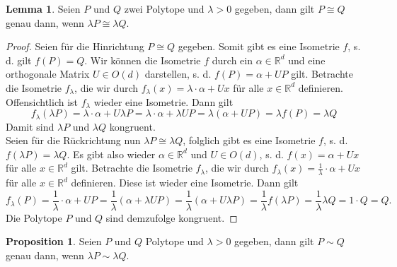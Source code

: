 \documentclass[11pt,titlepage]{article}
\newcommand{\setR}{\mathbb{R}}
\theoremstyle{definition}
\newtheorem{proposition}[theorem]{Proposition}
\newtheorem{lemma}[theorem]{Lemma}
\theoremstyle{remark}
\begin{document}
	\begin{lemma} \label{lemma:dilkong}
		Seien $P$ und $Q$ zwei Polytope und $\lambda>0$ gegeben, dann gilt 
		$P\cong Q$ genau dann, wenn $\lambda P\cong \lambda Q$.
	\end{lemma}
	
	\begin{proof}
		Seien für die Hinrichtung $P\cong Q$ gegeben. Somit gibt es eine Isometrie 
		$f$, s. d. gilt $f(P)=Q$. Wir können die Isometrie $f$ durch ein $\alpha\in
		\setR^d$ und eine orthogonale Matrix $U\in O(d)$ darstellen, s. d. 
		$f(P)=\alpha + UP$ gilt. Betrachte die Isometrie $f_{\lambda}$, die wir 
		durch $f_{\lambda}(x)=\lambda\cdot \alpha +Ux$ für alle $x\in\setR^d$ definieren. 
		Offensichtlich ist $f_{\lambda}$ wieder eine Isometrie. 
		Dann gilt
		\[f_{\lambda}(\lambda P)=\lambda\cdot \alpha+U \lambda P =\lambda\cdot 
		\alpha+\lambda U P =\lambda(\alpha+ U P)=\lambda f(P)=\lambda Q\]
		Damit sind $\lambda P$ und $\lambda Q$ kongruent. \\
		Seien für die Rückrichtung nun $\lambda P\cong \lambda Q$, folglich  
		gibt es eine Isometrie $f$, s. d. $f(\lambda P)=\lambda Q$. Es gibt 
		also wieder $\alpha\in\setR^d$ und $U\in O(d)$, s. d. 
		$f(x)=\alpha + Ux$ für alle $x\in\setR^d$ gilt. Betrachte die Isometrie 
		$f_{\lambda}$, die wir durch 
		$f_{\lambda}(x)=\frac{1}{\lambda}\cdot \alpha +U x$ für alle $x\in\setR^d$ 
		definieren. Diese ist wieder eine Isometrie. Dann gilt 
		\[f_{\lambda}(P)=\frac{1}{\lambda}\cdot \alpha +U P 
		=\frac{1}{\lambda}(\alpha+\lambda U P)
		=\frac{1}{\lambda}(\alpha + U \lambda P)
		=\frac{1}{\lambda} f(\lambda P)=\frac{1}{\lambda} \lambda Q =1\cdot Q=Q.\]
		Die Polytope $P$ und $Q$ sind demzufolge kongruent.
	\end{proof}
	
	\begin{proposition} \label{prop:dilzerl}
		Seien $P$ und $Q$ Polytope und $\lambda>0$ gegeben, dann gilt 
		$P\sim Q$ genau dann, wenn $\lambda P\sim \lambda Q$.
	\end{proposition}
	
\end{document}
